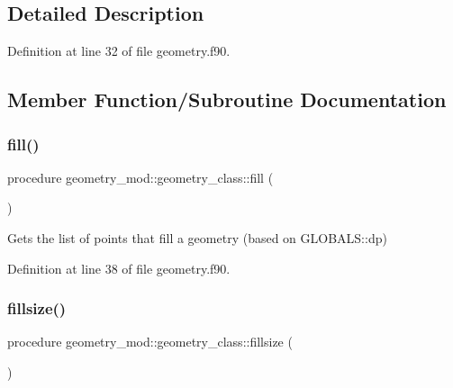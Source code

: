 \subsection{Detailed Description}


Definition at line 32 of file geometry.\+f90.



\subsection{Member Function/\+Subroutine Documentation}
\mbox{\label{structgeometry__mod_1_1geometry__class_a0afee5607f0e2443a862741e40794368}} 
\subsubsection{\texorpdfstring{fill()}{fill()}}
{\footnotesize\ttfamily procedure geometry\+\_\+mod\+::geometry\+\_\+class\+::fill (\begin{DoxyParamCaption}{ }\end{DoxyParamCaption})\hspace{0.3cm}{\ttfamily [private]}}



Gets the list of points that fill a geometry (based on G\+L\+O\+B\+A\+L\+S\+::dp) 



Definition at line 38 of file geometry.\+f90.

\mbox{\label{structgeometry__mod_1_1geometry__class_a75f5a37d0b38c8baf66ee5089ea44d7a}} 
\subsubsection{\texorpdfstring{fillsize()}{fillsize()}}
{\footnotesize\ttfamily procedure geometry\+\_\+mod\+::geometry\+\_\+class\+::fillsize (\begin{DoxyParamCaption}{ }\end{DoxyParamCaption})\hspace{0.3cm}{\ttfamily [private]}}



